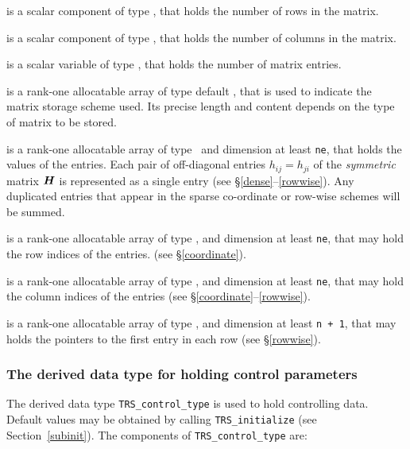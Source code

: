 \documentclass{galahad}
\newcommand{\packagename}{TRS}
\begin{document}
\begin{description}

 is a scalar component of type \integer,
that holds the number of rows in the matrix.

 is a scalar component of type \integer,
that holds the number of columns in the matrix.

 is a scalar variable of type \integer, that
holds the number of matrix entries.

 is a rank-one allocatable array of type default \character, that
is used to indicate the matrix storage scheme used. Its precise length and
content depends on the type of matrix to be stored.

 is a rank-one allocatable array of type \realdp\,
and dimension at least {\tt ne}, that holds the values of the entries.
Each pair of off-diagonal entries $h_{ij} = h_{ji}$ of the {\em symmetric}
matrix ${\bm{H}}$ is represented as a single entry
(see \S\ref{dense}--\ref{rowwise}).
Any duplicated entries that appear in the sparse
co-ordinate or row-wise schemes will be summed.

 is a rank-one allocatable array of type \integer,
and dimension at least {\tt ne}, that may hold the row indices of the entries.
(see \S\ref{coordinate}).

 is a rank-one allocatable array of type \integer,
and dimension at least {\tt ne}, that may hold the column indices of the entries
(see \S\ref{coordinate}--\ref{rowwise}).

 is a rank-one allocatable array of type \integer,
and dimension at least {\tt n + 1}, that may holds the pointers to
the first entry in each row (see \S\ref{rowwise}).

\end{description}


\subsubsection{The derived data type for holding control
 parameters}\label{typecontrol}
The derived data type
{\tt \packagename\_control\_type}
is used to hold controlling data. Default values may be obtained by calling
{\tt \packagename\_initialize}
(see Section~\ref{subinit}). The components of
{\tt \packagename\_control\_type}
are:
\end{document}
